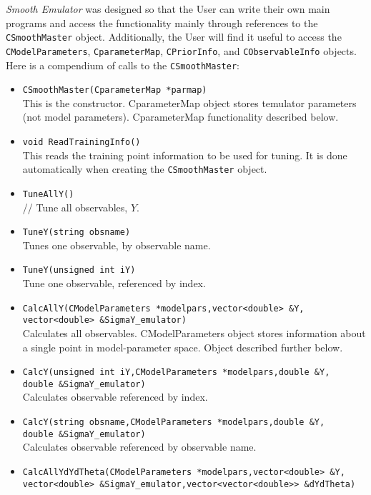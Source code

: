 \documentclass[UserManual.tex]{subfiles}
\begin{document}
{\it Smooth Emulator} was designed so that the User can write their own main programs and access the functionality mainly through references to the {\tt CSmoothMaster} object. Additionally, the User will find it useful to access the {\tt CModelParameters}, {\tt CparameterMap}, {\tt CPriorInfo}, and {\tt CObservableInfo} objects. Here is a compendium of calls to the {\tt CSmoothMaster}:
\begin{itemize}\itemsep=0pt
\item {\tt CSmoothMaster(CparameterMap *parmap)}\\
This is the constructor. CparameterMap object stores temulator parameters (not model parameters). CparameterMap functionality described below.
\item {\tt void ReadTrainingInfo()}\\
This reads the training point information to be used for tuning. It is done automatically when creating the {\tt CSmoothMaster} object.
\item {\tt TuneAllY()}\\ //
Tune all observables, $Y$.
\item {\tt TuneY(string obsname)}\\
Tunes one observable, by observable name.
\item {\tt TuneY(unsigned int iY)}\\
Tune one observable, referenced by index.
\item {\tt CalcAllY(CModelParameters *modelpars,vector<double> \&Y,\\vector<double> \&SigmaY\_emulator)}\\
Calculates all observables. CModelParameters object stores information about a single point in model-parameter space. Object described further below.
\item {\tt CalcY(unsigned int iY,CModelParameters *modelpars,double \&Y,\\double \&SigmaY\_emulator)}\\
Calculates observable referenced by index.
\item {\tt CalcY(string obsname,CModelParameters *modelpars,double \&Y,\\double \&SigmaY\_emulator)}\\
Calculates observable referenced by observable name.
\item {\tt CalcAllYdYdTheta(CModelParameters *modelpars,vector<double> \&Y,\\
vector<double> \&SigmaY\_emulator,vector<vector<double>> \&dYdTheta)}\\

\end{itemize}
\end{document}
